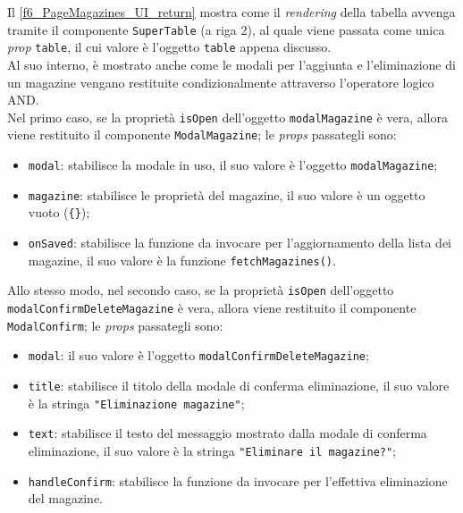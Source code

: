 
Il \autoref{f6_PageMagazines_UI_return} mostra come il \textit{rendering} della tabella avvenga tramite il componente \texttt{SuperTable} (a riga 2), al quale viene passata come unica \textit{prop} \texttt{table}, il cui valore è l'oggetto \texttt{table} appena discusso.\\
Al suo interno, è mostrato anche come le modali per l'aggiunta e l'eliminazione di un magazine vengano restituite condizionalmente attraverso l'operatore logico AND.\\
Nel primo caso, se la proprietà \texttt{isOpen} dell'oggetto \texttt{modalMagazine} è vera, allora viene restituito il componente \texttt{ModalMagazine}; le \textit{props} passategli sono:
\begin{itemize}
    \item \texttt{modal}: stabilisce la modale in uso, il suo valore è l'oggetto \texttt{modalMagazine};
    
    \item \texttt{magazine}: stabilisce le proprietà del magazine, il suo valore è un oggetto vuoto (\texttt{\{\}});
    
    \item \texttt{onSaved}: stabilisce la funzione da invocare per l'aggiornamento della lista dei magazine, il suo valore è la funzione \texttt{fetchMagazines()}.
\end{itemize}
Allo stesso modo, nel secondo caso, se la proprietà \texttt{isOpen} dell'oggetto \\\texttt{modalConfirmDeleteMagazine} è vera, allora viene restituito il componente \texttt{ModalConfirm}; le \textit{props} passategli sono:
\begin{itemize}
    \item \texttt{modal}: il suo valore è l'oggetto \texttt{modalConfirmDeleteMagazine};
    
    \item \texttt{title}: stabilisce il titolo della modale di conferma eliminazione, il suo valore è la stringa \texttt{"Eliminazione magazine"};
    
    \item \texttt{text}: stabilisce il testo del messaggio mostrato dalla modale di conferma eliminazione, il suo valore è la stringa \texttt{"Eliminare il magazine?"};
    
    \item \texttt{handleConfirm}: stabilisce la funzione da invocare per l'effettiva eliminazione del magazine.
\end{itemize}

